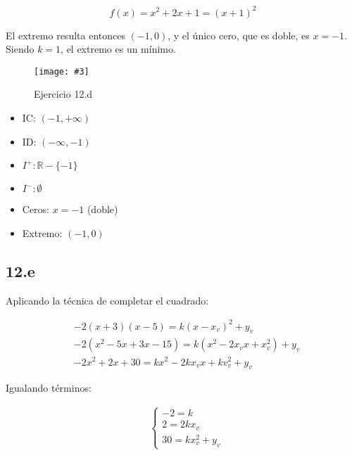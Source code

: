\documentclass{article}
\newcommand{\figurex}[4]{\begin{figure}[ht] \caption{#1} \texttt{[image: \#3]} \centering \label{#4}\end{figure}}
\begin{document}
\begin{equation}
f(x) = x^2 + 2x + 1 = (x+1)^2
\end{equation}

El extremo resulta entonces $(-1, 0)$, y el único cero, que es doble, es $x = -1$. Siendo $k = 1$, el extremo es un mínimo.

\figurex{Ejercicio 12.d}{4}{../img/guide_01/ex_12d.png}{fig:12d}

\begin{itemize}

\item IC: $(-1, +\infty)$

\item ID: $(-\infty, -1)$

\item $I^+: \mathbb{R} - \{ -1 \} $

\item $I^-: \emptyset $

\item Ceros: $x = -1$ (doble)

\item Extremo: $ (-1, 0) $

\end{itemize}

\subsection*{12.e}
\label{subsec:12.e}

Aplicando la técnica de completar el cuadrado:

\begin{subequations}
\begin{align}
& -2 (x+3) (x-5) = k (x-x_v)^2 + y_v \\
& -2 (x^2 -5x +3x -15) = k (x^2 -2 x_v x +x_v^2) + y_v \\
& -2 x^2 +2x + 30 = k x^2 - 2 k x_v x + k v_v^2 + y_v
\end{align}
\end{subequations}

Igualando términos:

\begin{subequations}
\begin{align}
& \left\{ \begin{array}{ll}
-2 = k \\
2 = 2 k x_v \\
30 = k x_v^2 + y_v
\end{array} \right.
\end{align}
\end{subequations}
\end{document}
